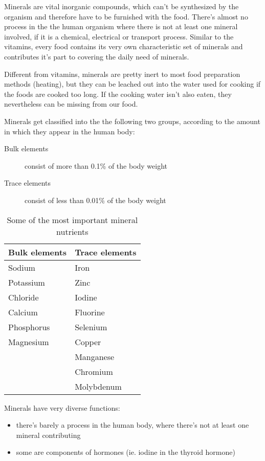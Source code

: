 \documentclass[../main.tex]{subfiles}
\begin{document}
Minerals are vital inorganic compounds, which can't be synthesized by the organism
and therefore have to be furnished with the food.
There's almost no process in the the human organism where there is not at least one mineral involved,
if it is a chemical, electrical or transport process.
Similar to the vitamins, every food contains its very own characteristic set of minerals and contributes it's part
to covering the daily need of minerals.

Different from vitamins, minerals are pretty inert to most food preparation methods (heating), but they can be leached out into
the water used for cooking if the foods are cooked too long.
If the cooking water isn't also eaten, they nevertheless can be missing from our food.

\vspace{5mm}
\noindent Minerals get classified into the the following two groups, according to the amount in which they  appear in the human body:

\begin{description}
  \item[Bulk elements] consist of more than 0.1\% of the body weight
\item[Trace elements] consist of less than 0.01\% of the body weight
\end{description}

\begin{table}[htb!]
  \centering
  \begin{tabular}{ll}
    \textbf{Bulk elements} & \textbf{Trace elements} \\
    \hline
    Sodium & Iron \\
    Potassium & Zinc \\
    Chloride & Iodine \\
    Calcium & Fluorine \\
    Phosphorus & Selenium \\
    Magnesium & Copper \\
                           & Manganese \\
                           & Chromium \\
    & Molybdenum \\
  \end{tabular}
  \caption[Most important minerals]{Some of the most important mineral nutrients}
\end{table}

Minerals have very diverse functions:
\begin{itemize}
\item there's barely a process in the human body, where there's not at least one mineral contributing
  \item some are components of hormones (ie. iodine in the thyroid hormone)
\end{itemize}
\end{document}
